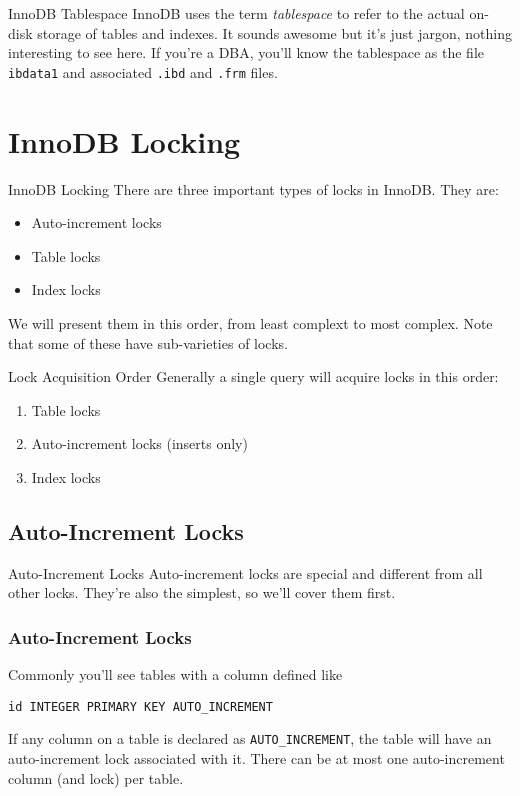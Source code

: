 \documentclass[14pt]{beamer}
\begin{document}
\begin{frame}{InnoDB Tablespace}
  InnoDB uses the term \emph{tablespace} to refer to the actual on-disk storage
  of tables and indexes. It sounds awesome but it's just jargon, nothing
  interesting to see here.
  \newline
  \newline
  If you're a DBA, you'll know the tablespace as the file \texttt{ibdata1} and
  associated \texttt{.ibd} and \texttt{.frm} files.
\end{frame}

\section{InnoDB Locking}

\begin{frame}{InnoDB Locking}
  There are three important types of locks in InnoDB. They are:
  \begin{itemize}
    \item Auto-increment locks
    \item Table locks
    \item Index locks
  \end{itemize}
  We will present them in this order, from least complext to most complex. Note
  that some of these have sub-varieties of locks.
\end{frame}

\begin{frame}{Lock Acquisition Order}
  Generally a single query will acquire locks in this order:
  \begin{enumerate}
    \item Table locks
    \item Auto-increment locks (inserts only)
    \item Index locks
  \end{enumerate}
\end{frame}

\subsection{Auto-Increment Locks}

\begin{frame}{Auto-Increment Locks}
  Auto-increment locks are special and different from all other locks. They're
  also the simplest, so we'll cover them first.
\end{frame}

\begin{frame}[fragile]
  \frametitle{Auto-Increment Locks}
  Commonly you'll see tables with a column defined like
\begin{verbatim}
id INTEGER PRIMARY KEY AUTO_INCREMENT
\end{verbatim}
  If any column on a table is declared as \texttt{AUTO\_INCREMENT}, the table
  will have an auto-increment lock associated with it. There can be at most one
  auto-increment column (and lock) per table.
\end{frame}
\end{document}
